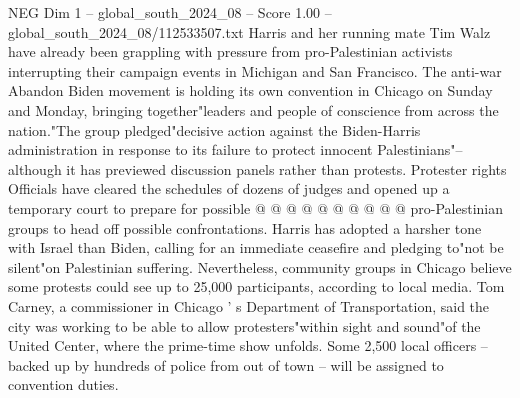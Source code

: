 \begin{textsample}{NEG Dim 1 – global\_south\_2024\_08 – Score 1.00 – global\_south\_2024\_08/112533507.txt}
Harris and her running mate Tim Walz have already been grappling with pressure from pro-Palestinian activists interrupting their campaign events in Michigan and San Francisco.
The anti-war Abandon Biden movement is holding its own convention in Chicago on Sunday and Monday, bringing together"leaders and people of conscience from across the nation."The group pledged"decisive action against the Biden-Harris administration in response to its failure to protect innocent Palestinians"-- although it has previewed discussion panels rather than protests.
Protester rights Officials have cleared the schedules of dozens of judges and opened up a temporary court to prepare for possible @ @ @ @ @ @ @ @ @ @ pro-Palestinian groups to head off possible confrontations.
Harris has adopted a harsher tone with Israel than Biden, calling for an immediate ceasefire and pledging to"not be silent"on Palestinian suffering.
Nevertheless, community groups in Chicago believe some protests could see up to 25,000 participants, according to local media.
Tom Carney, a commissioner in Chicago ' s Department of Transportation, said the city was working to be able to allow protesters"within sight and sound"of the United Center, where the prime-time show unfolds.
Some 2,500 local officers -- backed up by hundreds of police from out of town -- will be assigned to convention duties.

\end{textsample}
